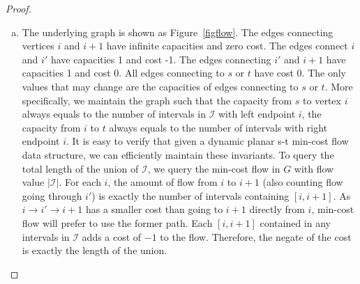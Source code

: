 \documentclass[11pt]{article}
\begin{document}
{\begin{proof}
\begin{enumerate}[(a)]
\begin{figure}
\centering
{}
\caption{dynamic \#SCC}\label{figscc}
\end{figure}

	\item
	The underlying graph is shown as Figure~\ref{figflow}. The edges connecting vertices $i$ and $i+1$ have infinite capacities and zero cost. The edges connect $i$ and $i'$ have capacities 1 and cost -1. The edges connecting $i'$ and $i+1$ have capacities 1 and cost 0. All edges connecting to $s$ or $t$ have cost 0. The only values that may change are the capacities of edges connecting to $s$ or $t$. More specifically, we maintain the graph such that the capacity from $s$ to vertex $i$ always equals to the number of intervals in $\mathcal{I}$ with left endpoint $i$, the capacity from $i$ to $t$ always equals to the number of intervals with right endpoint $i$. It is easy to verify that given a dynamic planar s-t min-cost flow data structure, we can efficiently maintain these invariants. To query the total length of the union of $\mathcal{I}$, we query the min-cost flow in $G$ with flow value $|\mathcal{I}|$. For each $i$, the amount of flow from $i$ to $i+1$ (also counting flow going through $i'$) is exactly the number of intervals containing $[i, i+1]$. As $i\rightarrow i'\rightarrow i+1$ has a smaller cost than going to $i+1$ directly from $i$, min-cost flow will prefer to use the former path. Each $[i,i+1]$ contained in any intervals in $\mathcal{I}$ adds a cost of $-1$ to the flow. Therefore, the negate of the cost is exactly the length of the union. 
	

\end{enumerate}
\end{proof}}
\end{document}

